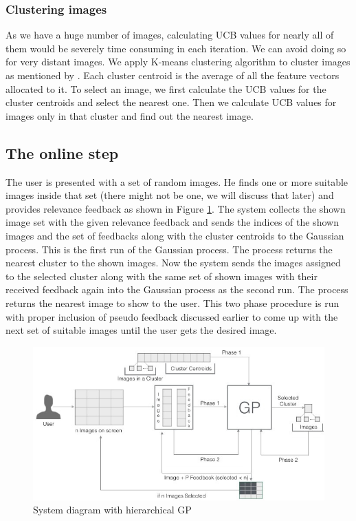 \documentclass[english]{tktltiki}
\begin{document}
\subsubsection{Clustering images}

As we have a huge number of images, calculating UCB values for nearly all of them would be severely time consuming in each iteration. We can avoid doing so for very distant images. We apply K-means \cite{k_means} clustering algorithm to cluster images as mentioned by \cite{hierarchical_gp}. Each cluster centroid is the average of all the feature vectors allocated to it. To select an image, we first calculate the UCB values for the cluster centroids and select the nearest one. Then we calculate UCB values for images only in that cluster and find out the nearest image.

\subsection{The online step} \label{experiment_1}

The user is presented with a set of random images. He finds one or more suitable images inside that set (there might not be one, we will discuss that later) and provides relevance feedback as shown in Figure \ref{system_diagram_1}. The system collects the shown image set with the given relevance feedback and sends the indices of the shown images and the set of feedbacks along with the cluster centroids to the Gaussian process. This is the first run of the Gaussian process. The process returns the nearest cluster to the shown images. Now the system sends the images assigned to the selected cluster along with the same set of shown images with their received feedback again into the Gaussian process as the second run. The process returns the nearest image to show to the user. This two phase procedure is run with proper inclusion of pseudo feedback discussed earlier to come up with the next set of suitable images until the user gets the desired image.


\begin{figure}[h!]
  \centering
    \includegraphics[width=1.0\textwidth]{figures/Imse_System_Diagram}
    \caption{System diagram with hierarchical GP}
    \label{system_diagram_1}
\end{figure}
\end{document}
